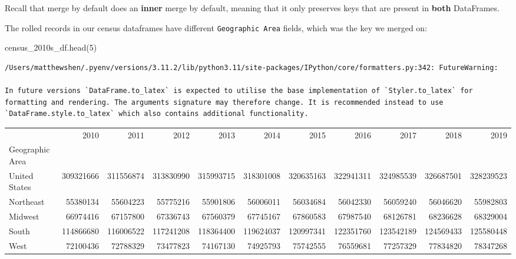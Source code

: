 \documentclass[
  letterpaper,
  DIV=11,
  numbers=noendperiod]{scrreprt}
\newenvironment{Shaded}{\begin{snugshade}}{\end{snugshade}}
\newcommand{\DecValTok}[1]{\textcolor[rgb]{0.68,0.00,0.00}{#1}}
\newcommand{\NormalTok}[1]{\textcolor[rgb]{0.00,0.23,0.31}{#1}}
\begin{document}
Recall that merge by default does an \textbf{inner} merge by default,
meaning that it only preserves keys that are present in \textbf{both}
DataFrames.

The rolled records in our census dataframes have different
\texttt{Geographic\ Area} fields, which was the key we merged on:

\begin{Shaded}
\begin{Highlighting}[]
\NormalTok{census\_2010s\_df.head(}\DecValTok{5}\NormalTok{)}
\end{Highlighting}
\end{Shaded}

\begin{verbatim}
/Users/matthewshen/.pyenv/versions/3.11.2/lib/python3.11/site-packages/IPython/core/formatters.py:342: FutureWarning:

In future versions `DataFrame.to_latex` is expected to utilise the base implementation of `Styler.to_latex` for formatting and rendering. The arguments signature may therefore change. It is recommended instead to use `DataFrame.style.to_latex` which also contains additional functionality.
\end{verbatim}

\begin{tabular}{lrrrrrrrrrr}
\toprule
{} &       2010 &       2011 &       2012 &       2013 &       2014 &       2015 &       2016 &       2017 &       2018 &       2019 \\
Geographic Area &            &            &            &            &            &            &            &            &            &            \\
\midrule
United States   &  309321666 &  311556874 &  313830990 &  315993715 &  318301008 &  320635163 &  322941311 &  324985539 &  326687501 &  328239523 \\
Northeast       &   55380134 &   55604223 &   55775216 &   55901806 &   56006011 &   56034684 &   56042330 &   56059240 &   56046620 &   55982803 \\
Midwest         &   66974416 &   67157800 &   67336743 &   67560379 &   67745167 &   67860583 &   67987540 &   68126781 &   68236628 &   68329004 \\
South           &  114866680 &  116006522 &  117241208 &  118364400 &  119624037 &  120997341 &  122351760 &  123542189 &  124569433 &  125580448 \\
West            &   72100436 &   72788329 &   73477823 &   74167130 &   74925793 &   75742555 &   76559681 &   77257329 &   77834820 &   78347268 \\
\bottomrule
\end{tabular}
\end{document}
